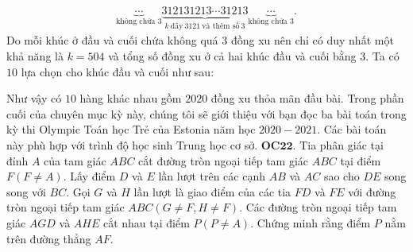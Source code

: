 \begin{multicols}{2}
	\begin{align*}
		\underbrace{\cdots}_{\text{không chứa $3$}} \underbrace{312131213\cdots 31213}_{k \ \text{dãy}\ 3121\ \text{và thêm số} \ 3 } \underbrace{\cdots}_{\text{không chứa $3$}}.
	\end{align*}
	Do mỗi khúc ở đầu và cuối chứa không quá $3$ đồng xu nên chỉ có duy nhất một khả năng là $k=504$ và tổng số đồng xu ở cả hai khúc đầu và cuối bằng $3$. Ta có $10$ lựa chọn cho khúc đầu và cuối như sau:
	\begin{table}[H]
		\centering
		\captionsetup{labelformat= empty, justification=centering}
				\setlength{\tabcolsep}{5pt}
		\vspace*{-5pt}
	\end{table}
	Như vậy có $10$ hàng khác nhau gồm $2020$ đồng xu thỏa mãn đầu bài.
	\vskip 0.1cm
	Trong phần cuối của chuyên mục kỳ này, chúng tôi sẽ giới thiệu với bạn đọc ba bài toán trong kỳ thi Olympic Toán học Trẻ của Estonia năm học $2020-2021$. Các bài toán này phù hợp với trình độ học sinh Trung học cơ sở.
	\vskip 0.1cm
	{\bf\color{cackithi} OC$\pmb{22.}$} Tia phân giác tại đỉnh $A$ của tam giác $ABC$ cắt đường tròn ngoại tiếp tam giác $ABC$ tại điểm $F (F \neq A).$ Lấy điểm $D$ và $E$ lần lượt trên các cạnh $AB$ và $AC$ sao cho $DE$ song song với $BC$. Gọi $G$ và $H$ lần lượt là giao điểm của các tia $FD$ và $FE$ với đường tròn ngoại tiếp tam giác $ABC (G \neq F, H \neq F).$ Các đường tròn ngoại tiếp tam giác $AGD$ và $AHE$ cắt nhau tại điểm $P (P \neq A).$ Chứng minh rằng điểm $P$ nằm trên đường thẳng $AF$.
	\begin{figure}[H]
		\vspace*{-10pt}
		\centering
		\captionsetup{labelformat= empty, justification=centering}

\end{figure}
\end{multicols}
